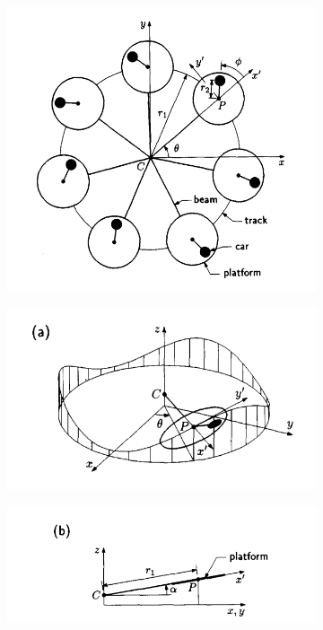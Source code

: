 \documentclass[11pt]{article}
\begin{document}
\begin{figure}[hbt!]
\centering
\begin{subfigure}{.25\textwidth}
\centering
\includegraphics[width=.99\linewidth]{ride1}
\end{subfigure}%
\begin{subfigure}{.25\textwidth}
\centering
\includegraphics[width=.99\linewidth]{ride2}
\end{subfigure}%
\begin{subfigure}{.25\textwidth}
\centering
\includegraphics[width=.99\linewidth]{ride3}

\end{subfigure}
\end{figure}
\end{document}
